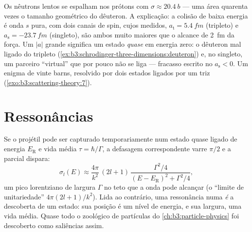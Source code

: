 \begin{example}\label{ex:b3:scattering-theory:np}
Os nêutrons lentos se espalham nos prótons com $\sigma \approx
\qty{20.4}{b}$ --- uma área quarenta vezes o tamanho geométrico do
dêuteron. A explicação: a colisão de baixa energia é onda $s$ pura, com
dois canais de spin, cujos  medidos,
$a_{\text{t}} = \qty{5.4}{fm}$ (tripleto) e $a_{\text{s}} =
\qty{-23.7}{fm}$ (singleto), são ambos muito maiores que o alcance de
\qty{2}{fm} da força. Um $|a|$ grande significa um estado \emph{quase}
em energia zero: o dêuteron mal ligado do tripleto
(\cref{ex:b3:schrodinger-three-dimensions:deuteron}) e, no singleto, um
parceiro ``virtual'' que por pouco não se liga --- fracasso escrito no
$a_{\text{s}} < 0$. Um enigma de vinte barns, resolvido por dois
estados ligados por um triz (\cref{exo:b3:scattering-theory:7}).
\end{example}

\section{Ressonâncias}

\begin{proposition}\label{prop:b3:scattering-theory:resonance}
Se o projétil pode ser capturado temporariamente num estado quase
ligado de energia $E_{\text{R}}$ e vida média $\tau = \hbar/\Gamma$, a
defasagem correspondente varre $\pi/2$ e a  parcial
dispara:
\[
\sigma_l(E) \approx \frac{4\pi}{k^2}\,(2l+1)\,
\frac{\Gamma^2/4}{(E - E_{\text{R}})^2 + \Gamma^2/4} ,
\]
um pico lorentziano de largura $\Gamma$ no teto que a onda pode
alcançar (o ``limite de unitariedade'' $4\pi(2l+1)/k^2$). Lida ao
contrário, uma ressonância numa  \emph{é} a descoberta
de um estado: sua posição é um nível de energia, e sua largura, uma
vida média. Quase todo o zoológico de partículas do
\cref{ch:b3:particle-physics} foi descoberto como saliências assim.
\end{proposition}
\admitted

